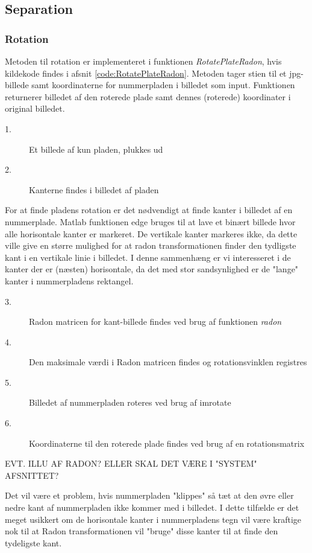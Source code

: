 \subsection{Separation}

\subsubsection{Rotation}
\label{sec:implementation/sep/rotation}

Metoden til rotation er implementeret i funktionen \textit{RotatePlateRadon}, hvis kildekode findes i afsnit \vref{code:RotatePlateRadon}. Metoden tager stien til et jpg-billede samt koordinaterne for nummerpladen i billedet som input. Funktionen returnerer billedet af den roterede plade samt dennes (roterede) koordinater i original billedet.

\begin{description}
\item[1.] Et billede af kun pladen, plukkes ud
\item[2.] Kanterne findes i billedet af pladen
\end{description}
For at finde pladens rotation er det nødvendigt at finde kanter i billedet af en nummerplade. Matlab funktionen edge bruges til at lave et binært billede hvor alle horisontale kanter er markeret. De vertikale kanter markeres ikke, da dette ville give en større mulighed for at radon transformationen finder den tydligste kant i en vertikale linie i billedet. I denne sammenhæng er vi interesseret i de kanter der er (næsten) horisontale, da det med stor sandsynlighed er de "lange" kanter i nummerpladens rektangel.

\begin{description}
\item[3.] Radon matricen for kant-billede findes ved brug af funktionen \textit{radon}
\item[4.] Den maksimale værdi i Radon matricen findes og rotationsvinklen registres
\item[5.] Billedet af nummerpladen roteres ved brug af imrotate
\item[6.] Koordinaterne til den roterede plade findes ved brug af en rotationsmatrix
\end{description}

EVT. ILLU AF RADON? ELLER SKAL DET VÆRE I "SYSTEM" AFSNITTET?

Det vil være et problem, hvis nummerpladen "klippes" så tæt at den øvre eller nedre kant af nummerpladen ikke kommer med i billedet. I dette tilfælde er det meget usikkert om de horisontale kanter i nummerpladens tegn vil være kraftige nok til at Radon transformationen vil "bruge" disse kanter til at finde den tydeligste kant.

